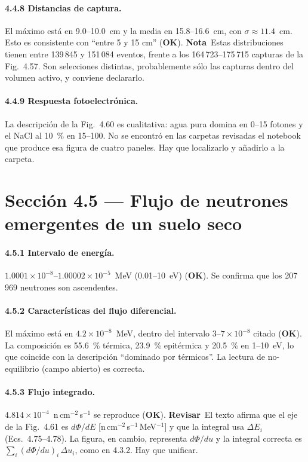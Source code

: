\documentclass[11pt,a4paper]{article}
\newcommand{\ok}{\textcolor{green!50!black}{\textbf{OK}}}
\newcommand{\alerta}{\textcolor{rojoAviso}{\textbf{Revisar}}}
\newcommand{\nota}{\textcolor{orange!80!black}{\textbf{Nota}}}
\begin{document}
\paragraph{4.4.8 Distancias de captura.}
El máximo está en 9.0--10.0~cm y la media en 15.8--16.6~cm, con $\sigma\approx11.4$~cm. Esto
es consistente con ``entre 5 y 15 cm'' (\ok). \nota\ Estas distribuciones tienen entre
139\,845 y 151\,084 eventos, frente a los 164\,723--175\,715 capturas de la Fig.~4.57. Son
selecciones distintas, probablemente sólo las capturas dentro del volumen activo, y conviene
declararlo.

\paragraph{4.4.9 Respuesta fotoelectrónica.}
La descripción de la Fig.~4.60 es cualitativa: agua pura domina en 0--15 fotones y el NaCl al
10~\% en 15--100. No se encontró en las carpetas revisadas el notebook que produce esa figura
de cuatro paneles. Hay que localizarlo y añadirlo a la carpeta.

\section{Sección 4.5 --- Flujo de neutrones emergentes de un suelo seco}

\paragraph{4.5.1 Intervalo de energía.}
$1.0001\times10^{-8}$--$1.00002\times10^{-5}$~MeV (0.01--10~eV) (\ok). Se confirma que los
207\,969 neutrones son ascendentes.

\paragraph{4.5.2 Características del flujo diferencial.}
El máximo está en $4.2\times10^{-8}$~MeV, dentro del intervalo $3$--$7\times10^{-8}$ citado
(\ok). La composición es 55.6~\% térmica, 23.9~\% epitérmica y 20.5~\% en 1--10~eV, lo que
coincide con la descripción ``dominado por térmicos''. La lectura de no-equilibrio (campo
abierto) es correcta.

\paragraph{4.5.3 Flujo integrado.}
$4.814\times10^{-4}$~n\,cm$^{-2}$\,s$^{-1}$ se reproduce (\ok). \alerta\ El texto afirma que el
eje de la Fig.~4.61 es $d\Phi/dE$ [n\,cm$^{-2}$\,s$^{-1}$\,MeV$^{-1}$] y que la integral usa
$\Delta E_i$ (Ecs.~4.75--4.78). La figura, en cambio, representa $d\Phi/du$ y la integral
correcta es $\sum_i(d\Phi/du)_i\,\Delta u_i$, como en 4.3.2. Hay que unificar.
\end{document}
